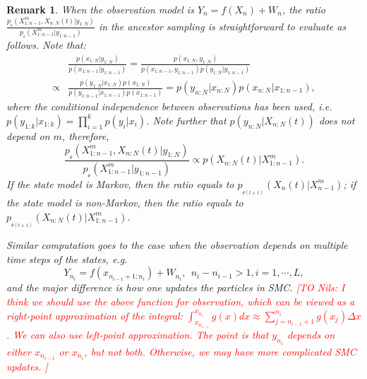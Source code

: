 \documentclass[12pt]{article}
\newtheorem{remark}[theorem]{Remark}
\begin{document}
\begin{remark}\label{rmk:ratio}
When the observation model is $Y_n= f(X_n) + W_n$, the ratio $\frac{p_{_\theta}(X^m_{1:n-1}, X_{n:N}(t)| y_{1:N})}{p_{_\theta}(X^m_{1:n-1}| y_{1:n-1})}$ in the ancestor sampling is straightforward to evaluate as follows. Note that: 
\begin{align*}
& \frac{p(x_{1:N}| y_{1:N})}{p(x_{1:n-1}| y_{1:n-1})} = \frac{p(x_{1:N}, y_{1:N})}{p(x_{1:n-1}, y_{1:n-1}) p(y_{1:N} | y_{1:n-1})} \\
\propto &  \frac{p(y_{1:N} | x_{1:N}) p(x_{1:N})} {p(y_{1:n-1} | x_{1:n-1}) p(x_{1:n-1})} = p(y_{n:N} | x_{n:N}) p(x_{n:N} |x_{1:n-1}), 
\end{align*}
where the conditional independence between observations has been used, i.e. $p(y_{1:k} | x_{1:k}) = \prod_{i=1}^k p(y_i|x_i)$. Note further that $p(y_{n:N} | X_{n:N}(t))$ does not depend on $m$, therefore,  
\[
\frac{p_{_\theta}(X^m_{1:n-1}, X_{n:N}(t)| y_{1:N})}{p_{_\theta}(X^m_{1:n-1}| y_{1:n-1})} \propto p(X_{n:N}(t) |X^m_{1:n-1}). 
\]
If the state model is Markov, then the ratio equals to $p_{_{\theta(t+1)}}(X_{n}(t) |X_{n-1}^m )$; if the state model is non-Markov, then the ratio equals to $p_{_{\theta(t+1)}}(X_{n:N}(t) |X_{1:n-1}^m )$.

Similar computation goes to the case when the observation depends on multiple time steps of the states, e.g. 
\[Y_{n_i} = f(x_{n_{i-1}+1:n_i} )+ W_{n_i}, \ \  n_i-n_{i-1} >1, i = 1,\cdots, L,\]
and the major difference is how one updates the particles in SMC. \textcolor{red}{\rm{ [TO Nils: I think we should use the above function for observation, which can be viewed as a right-point approximation of the integral: $\int_{x_{n_{i-1}}}^{x_{n_i}} g(x)dx \approx \sum_{j=n_{i-1}+1}^{n_i} g(x_j) \Delta x$. We can also use left-point approximation. The point is that $y_{n_i}$ depends on either $x_{n_{i-1}}$ or $x_{n_{i}}$, but not both. Otherwise, we may have more complicated SMC updates. ]}}


\end{remark}
\end{document}
